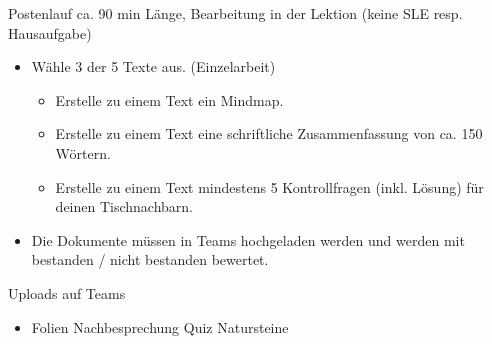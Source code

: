 \begin{frame}{Postenlauf}
ca. 90 min Länge, Bearbeitung in der Lektion (keine SLE resp. Hausaufgabe)
\begin{itemize}
    \item [\textbullet] Wähle 3 der 5 Texte aus. (Einzelarbeit)
    \begin{itemize}
        \item [\textbullet] Erstelle zu einem Text ein Mindmap. 
        \item [\textbullet] Erstelle zu einem Text eine schriftliche Zusammenfassung von ca. 150 Wörtern.
        \item [\textbullet] Erstelle zu einem Text mindestens 5 Kontrollfragen (inkl. Lösung) für deinen Tischnachbarn.
    \end{itemize}
    \item [\textbullet] Die Dokumente müssen in Teams hochgeladen werden und werden mit bestanden / nicht bestanden bewertet.
\end{itemize}
\end{frame}




    \begin{frame}{Uploads auf Teams}
        \begin{itemize}
            \item[\textbullet] Folien Nachbesprechung Quiz Natursteine
        \end{itemize}
        
    \end{frame}

        
    \folieFragen


    